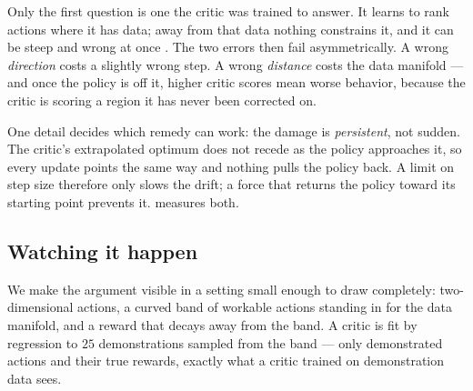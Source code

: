 Only the first question is one the critic was trained to answer. It learns to
rank actions where it has data; away from that data nothing constrains it, and
it can be steep and wrong at once
\citep{fujimoto2018td3,fujimoto2019bcq,savo2025}. The two errors then fail
asymmetrically. A wrong \emph{direction} costs a slightly wrong step. A wrong
\emph{distance} costs the data manifold --- and once the policy is off it,
higher critic scores mean worse behavior, because the critic is scoring a
region it has never been corrected on.

One detail decides which remedy can work: the damage is \emph{persistent},
not sudden. The critic's extrapolated optimum does not recede as the policy
approaches it, so every update points the same way and nothing pulls the
policy back. A limit on step size therefore only slows the drift; a force
that returns the policy toward its starting point prevents it.
 measures both.

\subsection{Watching it happen}
\label{sec:toy}

We make the argument visible in a setting small enough to draw completely:
two-dimensional actions, a curved band of workable actions standing in for
the data manifold, and a reward that decays away from the band. A critic is
fit by regression to $25$ demonstrations sampled from the band --- only
demonstrated actions and their true rewards, exactly what a critic trained
on demonstration data sees.

